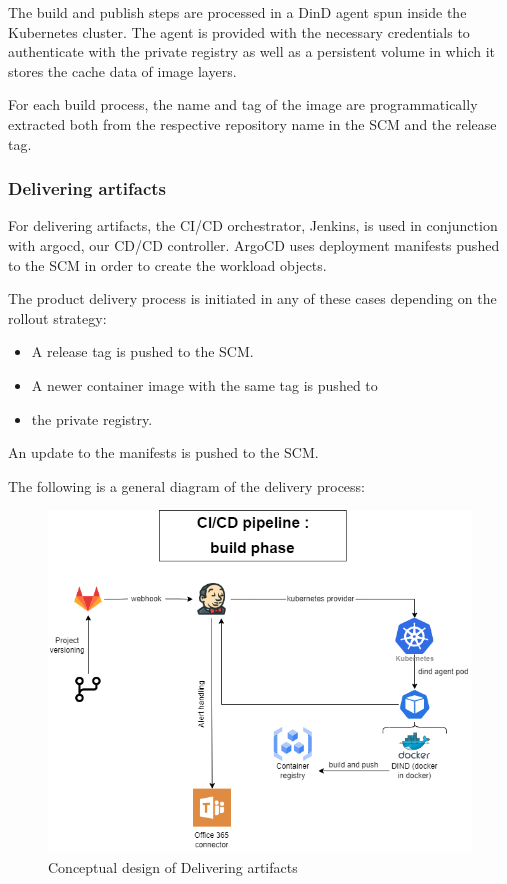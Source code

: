 The build and publish steps are processed in a DinD agent spun inside the Kubernetes cluster. The agent is provided with the necessary credentials to authenticate with the private registry as well as a persistent volume in which it stores the cache data of image layers. 

For each build process, the name and tag of the image are programmatically extracted both from the respective repository name in the SCM and the release tag. 

 

\subsubsection{Delivering artifacts }


For delivering artifacts, the CI/CD orchestrator, Jenkins, is used in conjunction with argocd, our CD/CD controller. ArgoCD uses deployment manifests pushed to the SCM in order to create the workload objects. 

The product delivery process is initiated in any of these cases depending on the rollout strategy: 

\begin{itemize}[label={--}]
\item A release tag is pushed to the SCM. 
\item A newer container image with the same tag is pushed to \item the private registry. 
\end{itemize}

An update to the manifests is pushed to the SCM. 

The following is a general diagram of the delivery process: 

\begin{figure}[H]\centering
\includegraphics[width=1.0\textwidth,angle=00]{assets/f49.png}
\caption{Conceptual design of Delivering artifacts }
\label{fig:Conceptual design of Delivering artifacts }
\end{figure}


